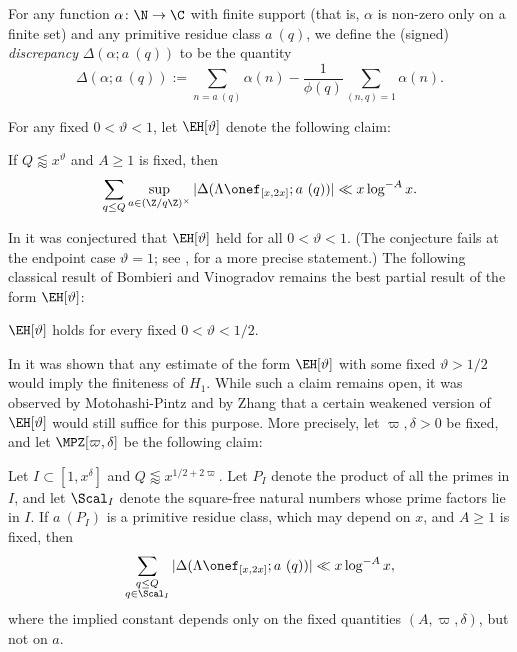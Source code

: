\begin{definition}[Discrepancy]
For any function $\alpha \colon \N \to \C$ with finite support (that is, $\alpha$ is non-zero only on a finite set) and any
primitive residue class $a\ (q)$, we define the (signed)
\emph{discrepancy} $\Delta(\alpha; a\ (q))$ to be the quantity
\begin{equation}\label{disc-def}
  \Delta(\alpha; a\ (q)) := \sum_{n = a\ (q)} \alpha(n) - 
  \frac{1}{\phi(q)} \sum_{(n,q)=1} \alpha(n).
\end{equation}
\end{definition}

For any fixed $0 < \vartheta < 1$, let $\EH[\vartheta]$ denote the following claim:

\begin{claim}\label{eh-def}  If $Q \lessapprox x^\vartheta$ and $A \geq 1$ is fixed, then
\begin{equation}\label{qq}
 \sum_{q \leq Q} \sup_{a \in (\Z/q\Z)^\times} |\Delta(\Lambda \onef_{[x,2x]}; a\ (q))| \ll x \log^{-A} x.
\end{equation} 
\end{claim}

In \cite{elliott} it was conjectured that $\EH[\vartheta]$ held for all $0 < \vartheta < 1$.  (The conjecture fails at the endpoint case $\vartheta=1$; see \cite{fg}, \cite{fghm} for a more precise statement.)  The following classical result of Bombieri \cite{bombieri} and Vinogradov \cite{vinogradov} remains the best partial result of the form $\EH[\vartheta]$:

\begin{theorem}\label{bv-thm}\cite{bombieri,vinogradov}  $\EH[\vartheta]$ holds for every fixed $0 < \vartheta < 1/2$.
\end{theorem}

In \cite{gpy} it was shown that any estimate of the form $\EH[\vartheta]$ with some fixed $\vartheta > 1/2$ would imply the finiteness of $H_1$.  While such a claim remains open, it was observed by Motohashi-Pintz \cite{mp} and by Zhang \cite{zhang} that a certain weakened version of $\EH[\vartheta]$ would still suffice for this purpose.  More precisely, let $\varpi,\delta > 0$ be fixed, and let $\MPZ[\varpi,\delta]$ be the following claim:

\begin{claim}\label{mpz-claim} Let $I \subset
  [1,x^\delta]$ and $Q \lessapprox x^{1/2+2\varpi}$.  Let $P_I$ denote the product of all the primes in $I$, and let $\Scal_I$ denote the square-free natural numbers whose prime factors lie in $I$.  If $a\ (P_I)$ is
  a primitive residue class, which may depend on $x$, and $A \geq 1$
  is fixed, then
\begin{equation}\label{qq-mpz}
  \sum_{\substack{q \leq Q\\q \in \Scal_I}} |\Delta(\Lambda \onef_{[x,2x]}; a\ (q))| \ll x \log^{-A} x,
\end{equation}
where the implied constant depends only on the fixed quantities $(A,\varpi,\delta)$, but
not on $a$.
\end{claim}

